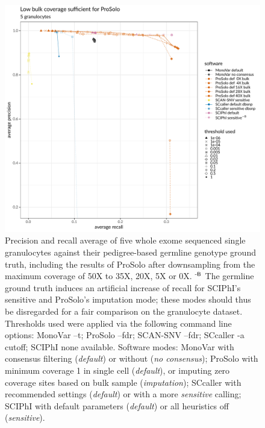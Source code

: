 \documentclass[authoryear,preprint,11pt]{scrartcl}
\begin{document}
\begin{figure}[!tpb]
  \includegraphics[width=.99\linewidth]{figs/Laehnemann2017/Laehnemann2017_prosolo-downsampling_prosolo-monovar-scansnv-sccaller-sciphi_precision-recall-plot_focus-top-left.pdf} \newline
 \caption{
  Precision and recall average of five whole exome sequenced single granulocytes against their pedigree-based germline genotype ground truth, including the results of ProSolo after downsampling from the maximum coverage of 50X to 35X, 20X, 5X or 0X.\newline 
  $^\text{\sffamily-B}$ The germline ground truth induces an artificial increase of recall for SCIPhI's sensitive and ProSolo's imputation mode; these modes should thus be disregarded for a fair comparison on the granulocyte dataset.\newline \footnotesize
  Thresholds used were applied via the following command line options:
  MonoVar {\ttfamily --t};
  ProSolo {\ttfamily --fdr};
  SCAN-SNV {\ttfamily --fdr};
  SCcaller {\ttfamily -a cutoff};
  SCIPhI {\ttfamily none available}.
  Software modes:
  MonoVar with consensus filtering ({\itshape default}) or without ({\itshape no consensus});
  ProSolo with minimum coverage 1 in single cell ({\itshape default}), or imputing zero coverage sites based on bulk sample ({\itshape imputation});
  SCcaller with recommended settings ({\itshape default}) or with a more {\itshape sensitive} calling;
  SCIPhI with default parameters ({\itshape default}) or all heuristics off ({\itshape sensitive}).
  }
 \label{fig:downsampling}
\end{figure}
\end{document}
